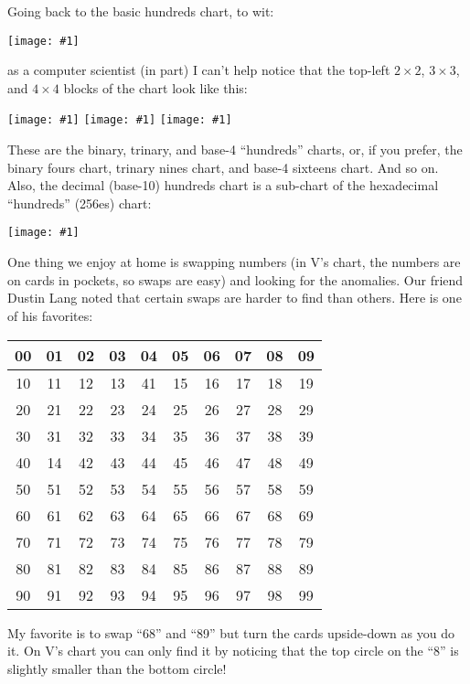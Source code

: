 \documentclass[12pt]{article}
\newcommand{\tablesize}{\footnotesize\sffamily}
\newcommand{\showchart}[1]{\texttt{[image: \#1]}}
\begin{document}
Going back to the basic hundreds chart, to wit:
\begin{center}
\showchart{hundreds_chart_default.pdf}
\end{center}
as a computer scientist (in part) I can't help notice that the
top-left $2\times 2$, $3\times 3$, and $4\times 4$ blocks of the
chart look like this:
\begin{center}
\showchart{hundreds_chart_2x2_base2.pdf}
\quad
\showchart{hundreds_chart_3x3_base3.pdf}
\quad
\showchart{hundreds_chart_4x4_base4.pdf}
\end{center}
These are the binary, trinary, and base-4 ``hundreds'' charts, or, if
you prefer, the binary fours chart, trinary nines chart, and base-4
sixteens chart.  And so on.  Also, the decimal (base-10) hundreds
chart is a sub-chart of the hexadecimal ``hundreds'' (256es) chart:
\begin{center}
\showchart{hundreds_chart_16x16_base16.pdf}
\end{center}

One thing we enjoy at home is swapping numbers (in V's chart, the
numbers are on cards in pockets, so swaps are easy) and looking for
the anomalies.  Our friend Dustin Lang noted that certain swaps are
harder to find than others.  Here is one of his favorites:
\begin{center}\tablesize
\begin{tabular}{|c|c|c|c|c|c|c|c|c|c|}
\hline
 00 & 01 & 02 & 03 & 04 & 05 & 06 & 07 & 08 & 09 \\ \hline
 10 & 11 & 12 & 13 & 41 & 15 & 16 & 17 & 18 & 19 \\ \hline
 20 & 21 & 22 & 23 & 24 & 25 & 26 & 27 & 28 & 29 \\ \hline
 30 & 31 & 32 & 33 & 34 & 35 & 36 & 37 & 38 & 39 \\ \hline
 40 & 14 & 42 & 43 & 44 & 45 & 46 & 47 & 48 & 49 \\ \hline
 50 & 51 & 52 & 53 & 54 & 55 & 56 & 57 & 58 & 59 \\ \hline
 60 & 61 & 62 & 63 & 64 & 65 & 66 & 67 & 68 & 69 \\ \hline
 70 & 71 & 72 & 73 & 74 & 75 & 76 & 77 & 78 & 79 \\ \hline
 80 & 81 & 82 & 83 & 84 & 85 & 86 & 87 & 88 & 89 \\ \hline
 90 & 91 & 92 & 93 & 94 & 95 & 96 & 97 & 98 & 99 \\ \hline
\end{tabular}
\end{center}
My favorite is to swap ``68'' and ``89'' but turn the cards
upside-down as you do it.  On V's chart you can only find it by
noticing that the top circle on the ``8'' is slightly smaller than the
bottom circle!
\end{document}
